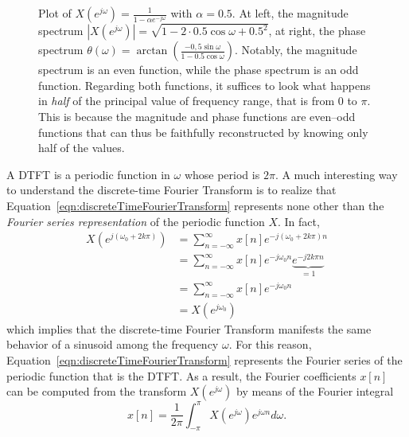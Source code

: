 \documentclass[\documentfontsize, twocolumn]{\classname}
\begin{document}
\begin{figure*}[ht]
\begin{center}
    \end{center}
    \caption{Plot of $X(e^{j\omega}) = \frac{1}{1-\alpha e^{-j\omega}}$ with $\alpha=0.5$. At left, the magnitude spectrum $|X(e^{j\omega})| = \sqrt{1 - 2\cdot 0.5 \cos{\omega} + 0.5^2}$, at right, the phase spectrum $\theta(\omega) = \arctan{\left(\frac{-0,5\sin{\omega}}{1 - 0.5\cos{\omega}}\right)}$. Notably, the magnitude spectrum is an even function, while the phase spectrum is an odd function. Regarding both functions, it suffices to look what happens in \emph{half} of the principal value of frequency range, that is from $0$ to $\pi$. This is because the magnitude and phase functions are even--odd functions that can thus be faithfully reconstructed by knowing only half of the values.} \label{tikz:dtftExample}
\end{figure*}

A DTFT is a periodic function in $\omega$ whose period is $2\pi$. A much interesting way to understand the discrete-time Fourier Transform is to realize that Equation~\ref{eqn:discreteTimeFourierTransform} represents none other than the \emph{Fourier series representation} of the periodic function $X$. In fact,
\begin{align*}
    X(e^{j(\omega_0 + 2k\pi)}) &= \sum_{n=-\infty}^\infty x[n] e^{-j(\omega_0 + 2k\pi)n} \\
                               &= \sum_{n=-\infty}^\infty x[n] e^{-j\omega_0n}\underbrace{e^{-j2k\pi n}}_{=1} \\
                               &= \sum_{n=-\infty}^\infty x[n] e^{-j\omega_0n} \\
                               &= X(e^{j\omega_0})
\end{align*}
which implies that the discrete-time Fourier Transform manifests the same behavior of a sinusoid among the frequency $\omega$. For this reason, Equation~\ref{eqn:discreteTimeFourierTransform} represents the Fourier series of the periodic function that is the DTFT. As a result, the Fourier coefficients $x[n]$ can be computed from the transform $X(e^{j\omega})$ by means of the Fourier integral
\begin{equation}\label{eqn:fourierIntegral}
    x[n] = \frac 1 {2\pi} \int_{-\pi}^\pi X(e^{j\omega})e^{j\omega n} d\omega.
\end{equation}
\end{document}
